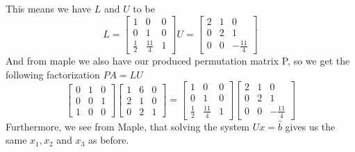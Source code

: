 \documentclass[12pt]{article}
\begin{document}
This means we have $L$ and $U$ to be
$$
L
=
\begin{bmatrix}
1 & 0 & 0\\
0 & 1 & 0 \\
\frac{1}{2} & \frac{11}{4} & 1 
\end{bmatrix}
U
=
\begin{bmatrix}
2 & 1 & 0\\
0 & 2 & 1 \\
0 & 0 & -\frac{11}{4} 
\end{bmatrix}
$$
And from maple we also have our produced permutation matrix P, so we get the following factorization $PA=LU$
$$
\begin{bmatrix}
0 & 1 & 0\\
0 & 0 & 1 \\
1 & 0 & 0
\end{bmatrix}
\begin{bmatrix}
1 & 6 & 0\\
2 & 1 & 0 \\
0 & 2 & 1
\end{bmatrix}
=
\begin{bmatrix}
1 & 0 & 0\\
0 & 1 & 0 \\
\frac{1}{2} & \frac{11}{4} & 1 
\end{bmatrix}
\begin{bmatrix}
2 & 1 & 0\\
0 & 2 & 1 \\
0 & 0 & -\frac{11}{4} 
\end{bmatrix}
$$
Furthermore, we see from Maple, that solving the system $Ux=\hat{b}$ gives us the same $x_1,x_2$ and $x_3$ as before.
\end{document}
